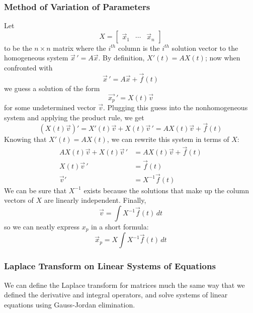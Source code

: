 \documentclass[12pt]{article}
\begin{document}
\subsubsection{Method of Variation of Parameters}

Let $$X = \begin{bmatrix} \vec{x}_1 & \cdots & \vec{x}_n \end{bmatrix}$$ to be the $n \times n$ matrix where the $i^{th}$ column is the $i^{th}$ solution vector to the homogeneous system $\vec{x} \, ' = A\vec{x}$. By definition, $X'(t) = AX(t)$; now when confronted with $$\vec{x} \, ' = A\vec{x} + \vec{f}(t)$$ we guess a solution of the form $$\vec{x_p} \, ' = X(t) \vec{v}$$ for some undetermined vector $\vec{v}$. Plugging this guess into the nonhomogeneous system and applying the product rule, we get $$\left(X(t) \vec{v}\right)' = X'(t) \vec{v} + X(t) \vec{v}\, ' = AX(t)\vec{v} + \vec{f}(t)$$ Knowing that $X'(t) = AX(t)$, we can rewrite this system in terms of $X$: $$\begin{aligned}
    AX(t) \vec{v} + X(t) \vec{v}\, ' &= AX(t)\vec{v} + \vec{f}(t)\\
    X(t)\vec{v}\,' &= \vec{f}(t)\\
    \vec{v}' &= X^{-1}\vec{f}(t)
\end{aligned}$$ We can be sure that $X^{-1}$ exists because the solutions that make up the column vectors of $X$ are linearly independent. Finally, $$\vec{v} = \int X^{-1} \vec{f}(t) \, dt $$ so we can neatly express $x_p$ in a short formula: $$\vec{x}_p = X \int X^{-1} \vec{f}(t) \, dt $$

\subsubsection{Laplace Transform on Linear Systems of Equations}

We can define the Laplace transform for matrices much the same way that we defined the derivative and integral operators, and solve systems of linear equations using Gauss-Jordan elimination.



\pagebreak

\printindex
\end{document}
